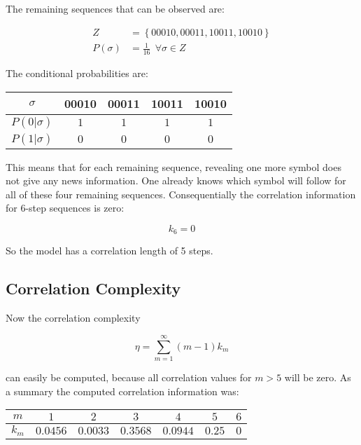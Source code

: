 \documentclass[12pt]{scrartcl}
\begin{document}
The remaining sequences that can be observed are:

\begin{equation}\begin{aligned}
Z &= \left\{
00010, 00011, 10011, 10010
\right\}\\
P(\sigma) &= \frac{1}{16} \ \ \forall \sigma \in Z
\end{aligned}\end{equation}

The conditional probabilities are:

\begin{table}[!h]
\centering
\begin{tabular}{c||c|c|c|c}
$\sigma$ & 00010 & 00011 & 10011 & 10010\\ \hline
$P(0|\sigma)$ & $1$ & $1$ & $1$ & $1$\\ \hline
$P(1|\sigma)$ & $0$ & $0$ & $0$ & $0$
\end{tabular}
\end{table}

This means that for each remaining sequence, revealing one more symbol does not give any news information. One already knows which symbol will follow for all of these four remaining sequences. Consequentially the correlation information for 6-step sequences is zero:

\begin{equation}
k_6 = 0
\end{equation}

So the model has a correlation length of 5 steps.

\subsection{Correlation Complexity}

Now the correlation complexity

\begin{equation}
\eta = \sum_{m=1}^\infty (m-1)k_m
\end{equation}

can easily be computed, because all correlation values for $m>5$ will be zero. As a summary the computed correlation information was:

\begin{table}[!h]
\centering
\begin{tabular}{c||c|c|c|c|c|c}
$m$ & $1$ & $2$ & $3$ & $4$ & $5$ & $6$\\ \hline
$k_m$ & $0.0456$ & $0.0033$ & $0.3568$ & $0.0944$ & $0.25$ & $0$
\end{tabular}
\end{table}
\end{document}
